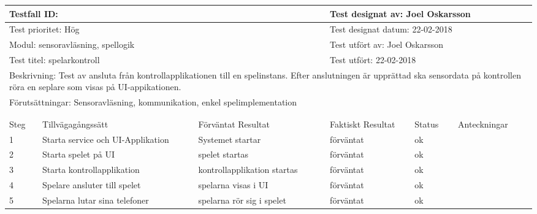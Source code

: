 


\begin{tabular}{@{}| p{1cm}|  p{3cm} | p{3cm}| p{3cm}| p{2cm}| p{3cm}|@{}}
  \hline
	\multicolumn{3}{|l|}{Testfall ID:}&\multicolumn{3}{|l|}{Test designat av: Joel Oskarsson}\\
	\hline
	\multicolumn{3}{|l|}{Test prioritet: Hög}&\multicolumn{3}{|l|}{Test designat datum: 22-02-2018}\\
	\hline
	\multicolumn{3}{|l|}{Modul: sensoravläsning, spellogik}&\multicolumn{3}{|l|}{Test utfört av: Joel Oskarsson}\\
	\hline
	\multicolumn{3}{|l|}{Test titel: spelarkontroll}&\multicolumn{3}{|l|}{Test utfört: 22-02-2018}\\
	\hline
	\multicolumn{6}{|p{\textwidth}|}{Beskrivning: Test av ansluta från kontrollapplikationen till en spelinstans. Efter anslutningen är upprättad ska sensordata på kontrollen röra en seplare som visas på UI-appikationen.}\\
	\hline
	\multicolumn{6}{|p{\textwidth}|}{Förutsättningar: Sensoravläsning, kommunikation, enkel spelimplementation}\\

	\hline
	\multicolumn{6}{|l|}{}\\
	\multicolumn{6}{|l|}{}\\
      	\hline
	Steg&Tillvägagångssätt&Förväntat Resultat&Faktiskt Resultat&Status&Anteckningar \\
	\hline
	1& Starta service och UI-Applikation & Systemet startar & förväntat & ok &\\
      	\hline
	2& Starta spelet på UI & spelet startas & förväntat & ok &\\
      	\hline
	3& Starta kontrollapplikation & kontrollapplikation startas & förväntat & ok &\\
      	\hline
  4& Spelare ansluter till spelet & spelarna visas i UI & förväntat & ok &\\
        \hline
  5& Spelarna lutar sina telefoner & spelarna rör sig i spelet & förväntat & ok &\\
      	\hline
\end{tabular}


